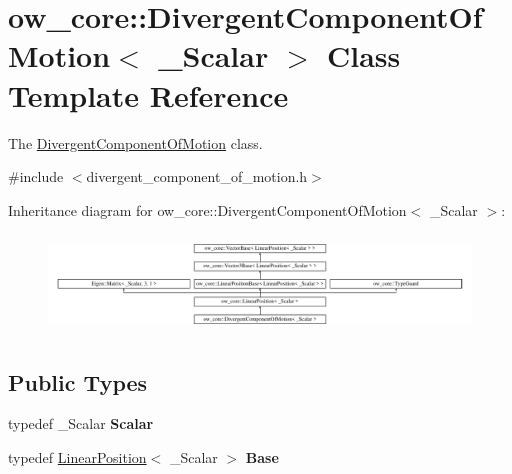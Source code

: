 \hypertarget{classow__core_1_1DivergentComponentOfMotion}{}\section{ow\+\_\+core\+:\+:Divergent\+Component\+Of\+Motion$<$ \+\_\+\+Scalar $>$ Class Template Reference}
\label{classow__core_1_1DivergentComponentOfMotion}


The \hyperlink{classow__core_1_1DivergentComponentOfMotion}{Divergent\+Component\+Of\+Motion} class.  




{\ttfamily \#include $<$divergent\+\_\+component\+\_\+of\+\_\+motion.\+h$>$}

Inheritance diagram for ow\+\_\+core\+:\+:Divergent\+Component\+Of\+Motion$<$ \+\_\+\+Scalar $>$\+:\begin{figure}[H]
\begin{center}
\leavevmode
\includegraphics[height=2.629108cm]{d9/d68/classow__core_1_1DivergentComponentOfMotion}
\end{center}
\end{figure}
\subsection*{Public Types}
\begin{DoxyCompactItemize}
\item 
typedef \+\_\+\+Scalar {\bfseries Scalar}\hypertarget{classow__core_1_1DivergentComponentOfMotion_a0f7395460777b2941ad1461f4a4a7a60}{}\label{classow__core_1_1DivergentComponentOfMotion_a0f7395460777b2941ad1461f4a4a7a60}

\item 
typedef \hyperlink{classow__core_1_1LinearPosition}{Linear\+Position}$<$ \+\_\+\+Scalar $>$ {\bfseries Base}\hypertarget{classow__core_1_1DivergentComponentOfMotion_a217adf3f42c036559d46be52fa3e0bfb}{}\label{classow__core_1_1DivergentComponentOfMotion_a217adf3f42c036559d46be52fa3e0bfb}

\end{DoxyCompactItemize}
